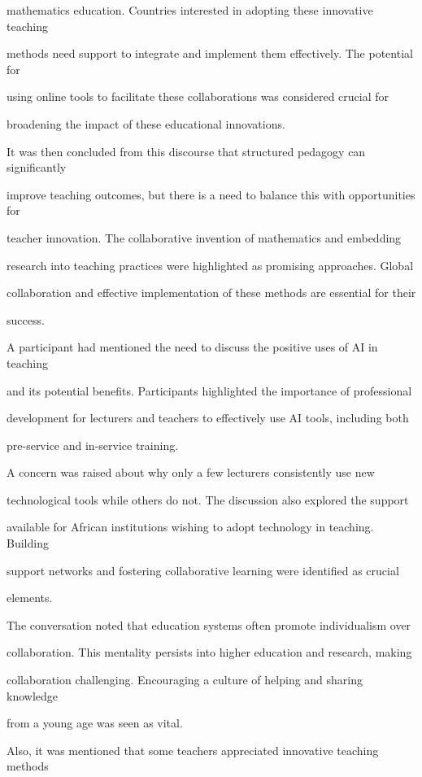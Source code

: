 \documentclass[11pt]{article}
\begin{document}
mathematics education. Countries interested in adopting these innovative teaching

methods need support to integrate and implement them effectively. The potential for

using online tools to facilitate these collaborations was considered crucial for

broadening the impact of these educational innovations.

It was then concluded from this discourse that structured pedagogy can significantly

improve teaching outcomes, but there is a need to balance this with opportunities for

teacher innovation. The collaborative invention of mathematics and embedding

research into teaching practices were highlighted as promising approaches. Global

collaboration and effective implementation of these methods are essential for their

success.

A participant had mentioned the need to discuss the positive uses of AI in teaching

and its potential benefits. Participants highlighted the importance of professional

development for lecturers and teachers to effectively use AI tools, including both

pre-service and in-service training.

A concern was raised about why only a few lecturers consistently use new

technological tools while others do not. The discussion also explored the support

available for African institutions wishing to adopt technology in teaching. Building

support networks and fostering collaborative learning were identified as crucial

elements.

The conversation noted that education systems often promote individualism over

collaboration. This mentality persists into higher education and research, making

collaboration challenging. Encouraging a culture of helping and sharing knowledge

from a young age was seen as vital.

Also, it was mentioned that some teachers appreciated innovative teaching methods
\end{document}
